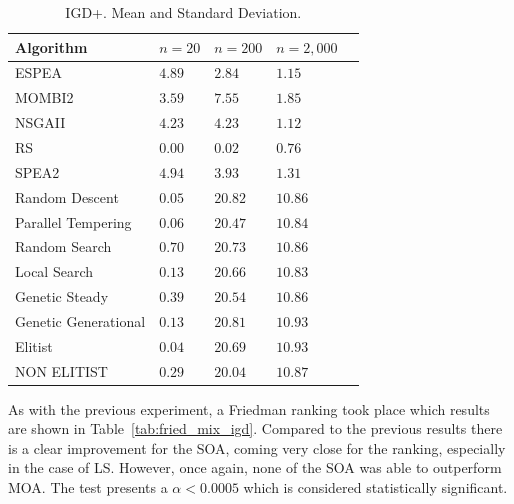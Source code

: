 \begin{table}[H]
    \centering
    {%
    \begin{tabular}{lllll}
    \hline
    Algorithm & $n=20$ & $n=200$ & $n=2,000$ \\
    \hline
    ESPEA                & $  4.89$                    & \cellcolor{gray25}$  2.84$ & $  1.15$                  \\
    MOMBI2               & $  3.59$                    & $ 7.55$  & $  1.85$                 \\
    NSGAII               & $  4.23$                    & $  4.23$                    & \cellcolor{gray25}$  1.12$   \\
    RS                   & \cellcolor{gray95}$ 0.00$   & \cellcolor{gray95}$  0.02$   & \cellcolor{gray95}$  0.76$  \\
    SPEA2                & $  4.94$                    & $   3.93$                    & $   1.31$                   \\
    Random Descent       & $  0.05$                    & $  20.82$                    & $  10.86$                   \\
    Parallel Tempering   & $  0.06$                    & $  20.47$                    & $  10.84$                   \\
    Random Search        & $  0.70$                    & $  20.73$                    & $  10.86$                   \\
    Local Search         & $  0.13$                    & $  20.66$                    & $  10.83$                   \\
    Genetic Steady       & $  0.39$                    & $  20.54$                    & $  10.86$                   \\
    Genetic Generational & $  0.13$                    & $  20.81$                    & $  10.93$                   \\
    Elitist              & \cellcolor{gray25}$  0.04$ & $  20.69$                    & $  10.93$                   \\
    NON ELITIST          & $  0.29$                    & $  20.04$                    & $  10.87$                   \\
    \hline
    \end{tabular}%
    }
    \caption{IGD+. Mean and Standard Deviation.}
    \label{tab:me_std_mix_igdp}
\end{table}

As with the previous experiment, a Friedman ranking took place which results are shown in Table~\ref{tab:fried_mix_igd}. Compared to the previous results there is a clear improvement for the SOA, coming very close for the ranking, especially in the case of LS. However, once again, none of the SOA was able to outperform MOA. The test presents a $\alpha < 0.0005$ which is considered statistically significant.

